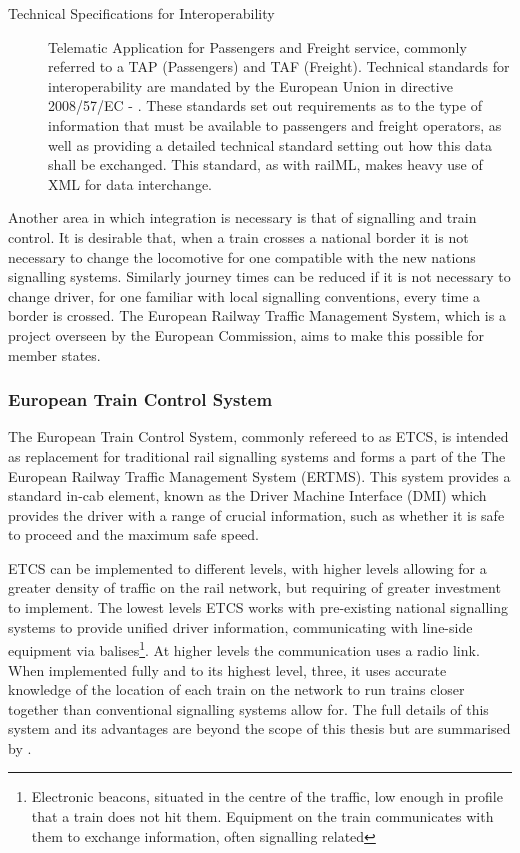 \begin{description}
    \item[Technical Specifications for Interoperability] Telematic Application for Passengers and Freight service, commonly referred to a TAP (Passengers) and TAF (Freight). Technical standards for interoperability are mandated by the European Union in directive 2008/57/EC - \citet{CounciloftheEuropeanUnionq2008}. These standards set out requirements as to the type of information that must be available to passengers and freight operators, as well as providing a detailed technical standard setting out how this data shall be exchanged. This standard, as with railML, makes heavy use of XML for data interchange.  
\end{description}

Another area in which integration is necessary is that of signalling and train control. It is desirable that, when a train crosses a national border it is not necessary to change the locomotive for one compatible with the new nations signalling systems. Similarly journey times can be reduced if it is not necessary to change driver, for one familiar with local signalling conventions, every time a border is crossed. The European Railway Traffic Management System, which is a project overseen by the European Commission, aims to make this possible for member states.

\subsubsection{European Train Control System}
\label{sec:etcs}
The European Train Control System, commonly refereed to as ETCS, is intended as replacement for traditional rail signalling systems and forms a part of the The European Railway Traffic Management System (ERTMS). This system provides a standard in-cab element, known as the Driver Machine Interface (DMI) which provides the driver with a range of crucial information, such as whether it is safe to proceed and the maximum safe speed. 

ETCS can be implemented to different levels, with higher levels allowing for a greater density of traffic on the rail network, but requiring of greater investment to implement. The lowest levels ETCS works with pre-existing national signalling systems to provide unified driver information, communicating with line-side equipment via balises\footnote{Electronic beacons, situated in the centre of the traffic, low enough in profile that a train does not hit them. Equipment on the train communicates with them to exchange information, often signalling related}. At higher levels the communication uses a radio link. When implemented fully and to its highest level, three, it uses accurate knowledge of the location of each train on the network to run trains closer together than conventional signalling systems allow for. The full details of this system and its advantages are beyond the scope of this thesis but are summarised by \citet{EC2011}.


